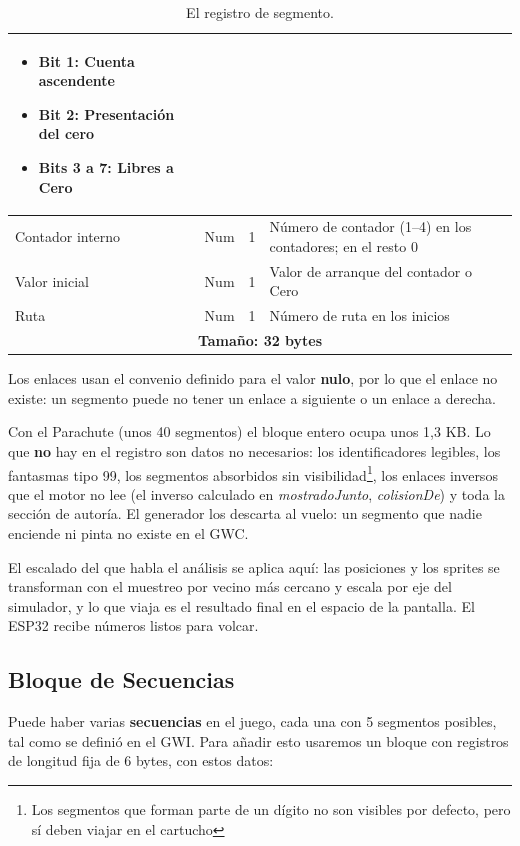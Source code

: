 \begin{table}[H]
\begin{tabular}{|l|c|c|p{8.4cm}|}
\begin{itemize}
			\item \textbf{Bit 1:} Cuenta ascendente
			\item \textbf{Bit 2:} Presentación del cero
			\item \textbf{Bits 3 a 7:} Libres a Cero
		\end{itemize} \\
		\hline
		Contador interno & Num & 1 & Número de contador (1--4) en los contadores; en el resto 0 \\
		\hline
		Valor inicial & Num & 1 & Valor de arranque del contador o Cero \\
		\hline
		Ruta & Num & 1 & Número de ruta en los inicios \\
		\hline
		\hline\hline
		\multicolumn{4}{|c|}{\textbf{Tamaño: 32 bytes}} \\
		\hline
	\end{tabular}
	\caption{El registro de segmento.}
\end{table}

Los enlaces usan el convenio definido para el valor \textbf{nulo}, por lo que el enlace no existe: un segmento puede no tener un enlace a siguiente o un enlace a derecha.

Con el Parachute (unos 40 segmentos) el bloque entero ocupa unos
1,3 KB. Lo que \textbf{no} hay en el registro son datos no necesarios: los identificadores legibles, los fantasmas tipo
99, los segmentos absorbidos sin visibilidad\footnote{Los segmentos que forman parte de un dígito no son visibles por defecto, pero sí deben viajar en el cartucho}, los enlaces inversos que el motor no lee
(el inverso calculado en \emph{mostradoJunto}, \emph{colisionDe}) y toda la sección de autoría. El generador los descarta al vuelo: un segmento que nadie
enciende ni pinta no existe en el GWC.

El escalado del que habla el análisis se aplica aquí: las
posiciones y los sprites se transforman con el muestreo por vecino
más cercano y escala por eje del simulador, y lo que viaja es el
resultado final en el espacio de la pantalla. El ESP32 recibe
números listos para volcar.

\subsection{Bloque de Secuencias}
\label{sec:F5I2Secuencias}

Puede haber varias \textbf{secuencias} en el juego, cada una con 5 segmentos posibles, tal como se definió en el GWI. Para añadir esto usaremos un bloque con registros de longitud fija de 6 bytes, con estos datos:

